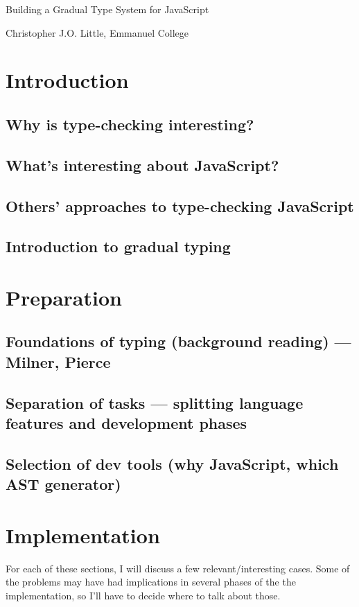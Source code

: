 \documentclass{article}
\begin{document}
	\vfil 
	\centerline{\Large Building a Gradual Type System for JavaScript }
	\vspace{0.4in}
	\centerline{\large Christopher J.O. Little, Emmanuel College}

	\section{Introduction}\label{introduction}
		\subsection{Why is type-checking interesting?}
		\subsection{What's interesting about JavaScript?}
		\subsection{Others' approaches to type-checking JavaScript}
		\subsection{Introduction to gradual typing}
	\section{Preparation}\label{preparation}
		\subsection{Foundations of typing (background reading) --- Milner, Pierce}
		\subsection{Separation of tasks --- splitting language features and development phases}
		\subsection{Selection of dev tools (why JavaScript, which AST generator)}
	\section{Implementation}\label{implementation}

		For each of these sections, I will discuss a few relevant/interesting
		cases. Some of the problems may have had implications in several
		phases of the the implementation, so I'll have to decide where to talk
		about those. 
\end{document}
